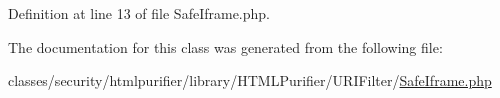 Definition at line 13 of file Safe\+Iframe.\+php.



The documentation for this class was generated from the following file\+:\begin{DoxyCompactItemize}
\item 
classes/security/htmlpurifier/library/\+H\+T\+M\+L\+Purifier/\+U\+R\+I\+Filter/\hyperlink{SafeIframe_8php}{Safe\+Iframe.\+php}\end{DoxyCompactItemize}
